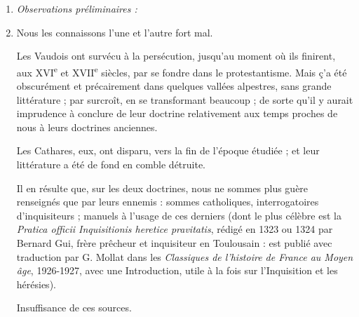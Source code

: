 \documentclass[french,twoside]{book} %
\newlength{\listmod}
\newcommand{\listhead}[1]{\hspace{-1\listmod}\emph{#1}}
\begin{document}
\begin{enumerate}[itemsep=\baselineskip,]
\item[]\listhead{Observations préliminaires :}
\item Nous les connaissons l’une et l’autre fort mal.\par
Les Vaudois ont survécu à la persécution, jusqu’au moment où ils finirent, aux XVI\textsuperscript{e} et XVII\textsuperscript{e} siècles, par se fondre dans le protestantisme. Mais ç’a été obscurément et précairement dans quelques vallées alpestres, sans grande littérature ; par surcroît, en se transformant beaucoup ; de sorte qu’il y aurait imprudence à conclure de leur doctrine relativement aux temps proches de nous à leurs doctrines anciennes.\par
Les Cathares, eux, ont disparu, vers la fin de l’époque étudiée ; et leur littérature a été de fond en comble détruite.\par
Il en résulte que, sur les deux doctrines, nous ne sommes plus guère renseignés que par leurs ennemis : sommes catholiques, interrogatoires d’inquisiteurs ; manuels à l’usage de ces derniers (dont le plus célèbre est la {\itshape Pratica officii Inquisitionis heretice pravitatis}, rédigé en 1323 ou 1324 par Bernard Gui, frère prêcheur et inquisiteur en Toulousain : est publié avec traduction par G. Mollat dans les {\itshape Classiques de l’histoire de France au Moyen âge}, 1926-1927, avec une Introduction, utile à la fois sur l’Inquisition et les hérésies).\par
Insuffisance de ces sources.


\end{enumerate}
\end{document}
